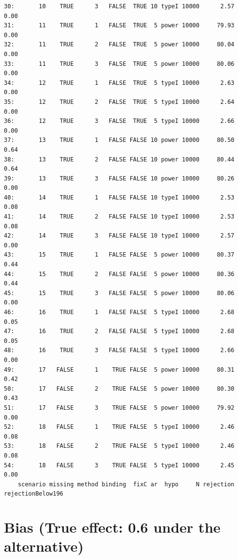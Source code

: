 \documentclass[12pt]{article}
\begin{document}
\begin{verbatim}
30:       10    TRUE      3   FALSE  TRUE 10 typeI 10000      2.57              0.00
31:       11    TRUE      1   FALSE  TRUE  5 power 10000     79.93              0.00
32:       11    TRUE      2   FALSE  TRUE  5 power 10000     80.04              0.00
33:       11    TRUE      3   FALSE  TRUE  5 power 10000     80.06              0.00
34:       12    TRUE      1   FALSE  TRUE  5 typeI 10000      2.63              0.00
35:       12    TRUE      2   FALSE  TRUE  5 typeI 10000      2.64              0.00
36:       12    TRUE      3   FALSE  TRUE  5 typeI 10000      2.66              0.00
37:       13    TRUE      1   FALSE FALSE 10 power 10000     80.50              0.64
38:       13    TRUE      2   FALSE FALSE 10 power 10000     80.44              0.64
39:       13    TRUE      3   FALSE FALSE 10 power 10000     80.26              0.00
40:       14    TRUE      1   FALSE FALSE 10 typeI 10000      2.53              0.08
41:       14    TRUE      2   FALSE FALSE 10 typeI 10000      2.53              0.08
42:       14    TRUE      3   FALSE FALSE 10 typeI 10000      2.57              0.00
43:       15    TRUE      1   FALSE FALSE  5 power 10000     80.37              0.44
44:       15    TRUE      2   FALSE FALSE  5 power 10000     80.36              0.44
45:       15    TRUE      3   FALSE FALSE  5 power 10000     80.06              0.00
46:       16    TRUE      1   FALSE FALSE  5 typeI 10000      2.68              0.05
47:       16    TRUE      2   FALSE FALSE  5 typeI 10000      2.68              0.05
48:       16    TRUE      3   FALSE FALSE  5 typeI 10000      2.66              0.00
49:       17   FALSE      1    TRUE FALSE  5 power 10000     80.31              0.42
50:       17   FALSE      2    TRUE FALSE  5 power 10000     80.30              0.43
51:       17   FALSE      3    TRUE FALSE  5 power 10000     79.92              0.00
52:       18   FALSE      1    TRUE FALSE  5 typeI 10000      2.46              0.08
53:       18   FALSE      2    TRUE FALSE  5 typeI 10000      2.46              0.08
54:       18   FALSE      3    TRUE FALSE  5 typeI 10000      2.45              0.00
    scenario missing method binding  fixC ar  hypo     N rejection rejectionBelow196
\end{verbatim}

\clearpage

\section{Bias (True effect: 0.6 under the alternative)}
\label{sec:org9c4a5e8}
\end{document}

